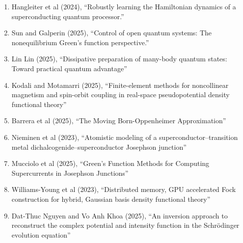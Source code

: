 \documentclass[]{article}
\begin{document}
\begin{enumerate}
\item Hangleiter et al (2024)\cite{hangleiter2024robustly}, ``Robustly learning the Hamiltonian dynamics of a superconducting quantum processor.''
\item Sun and Galperin (2025)\cite{sun2025control}, ``Control of open quantum systems: The nonequilibrium Green’s function perspective.''
\item Lin Lin (2025)\cite{lin2025dissipative}, ``Dissipative preparation of many-body quantum states: Toward practical quantum advantage''
\item Kodali and Motamarri (2025)\cite{PhysRevB.111.195129}, ``Finite-element methods for noncollinear magnetism and spin-orbit coupling in real-space pseudopotential density functional theory''
\item Barrera et al (2025)\cite{barrera2025movingbornoppenheimerapproximation}, ``The Moving Born-Oppenheimer Approximation''
\item Nieminen et al (2023)\cite{PhysRevB.107.174524}, ``Atomistic modeling of a superconductor--transition metal dichalcogenide--superconductor Josephson junction''
\item Mucciolo et al (2025)\cite{mucciolo2025greensfunctionmethodscomputing}, ``Green's Function Methods for Computing Supercurrents in Josephson Junctions''
\item Williams-Young et al (2023)\cite{williams2023distributed}, ``Distributed memory, GPU accelerated Fock construction for hybrid, Gaussian basis density functional theory''
\item Dat-Thuc Nguyen and Vo Anh Khoa (2025)\cite{nguyen2025inversion}, ``An inversion approach to reconstruct the complex potential and intensity function in the Schr{\"o}dinger evolution equation''

\end{enumerate}
\end{document}
